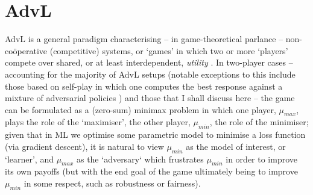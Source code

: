\section{\Acl{AdvL}}\label{sec:advl}
\Ac{AdvL} is a general paradigm characterising -- in game-theoretical parlance --
non-co{\"o}perative (competitive) systems, or `games' in which two or more `players' compete over
shared, or at least interdependent, \emph{utility} \citep{fudenberg1991game}.
%
%
In two-player cases -- accounting for the majority of \ac{AdvL} setups (notable exceptions to this
include those based on self-play in which one computes the best response against a mixture of
adversarial policies \citep{silver2017mastering, vinyals2019grandmaster}) and those that I shall
discuss here -- the game can be formulated as a (zero-sum) minimax problem in which one player,
\(\mu_{max}\), plays the role of the `maximiser', the other player, \(\mu_{min}\), the role of the
minimiser; given that in \ac{ML} we optimise some parametric model to minimise a loss function (via
gradient descent), it is natural to view \(\mu_{min}\) as the model of interest, or `learner', and
\(\mu_{max}\) as the `adversary` which frustrates \(\mu_{min}\) in order to improve its own payoffs
(but with the end goal of the game ultimately being to improve \(\mu_{min}\) in some respect, such
as robustness or fairness).
%

